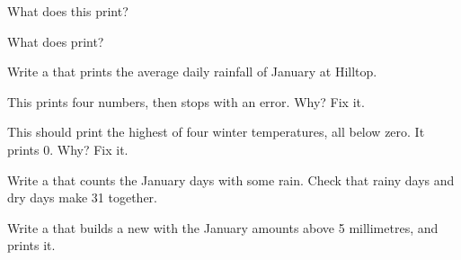 \begin{exercise}[$\star$]\label{exo:g7:lists:2}
What does this  print?

\label{lst:g7:lists:three-ops}
\end{exercise}

\begin{exercise}[$\star$]\label{exo:g7:lists:3}
What does  print?
\end{exercise}

\begin{exercise}[$\star$]\label{exo:g7:lists:4}
Write a  that prints the average daily rainfall of January at Hilltop.
\end{exercise}

\begin{exercise}[$\star\star$]\label{exo:g7:lists:5}
This  prints four numbers, then stops with an error. Why? Fix it.

\label{lst:g7:lists:off-by-one}
\end{exercise}

\begin{exercise}[$\star\star$]\label{exo:g7:lists:6}
This  should print the highest of four winter temperatures, all below
zero. It prints 0. Why? Fix it.

\label{lst:g7:lists:largest-bug}
\end{exercise}

\begin{exercise}[$\star\star$]\label{exo:g7:lists:7}
Write a  that counts the January days with some rain. Check that
rainy days and dry days make 31 together.
\end{exercise}

\begin{exercise}[$\star\star$]\label{exo:g7:lists:8}
Write a  that builds a new  with the January amounts above 5
millimetres, and prints it.
\end{exercise}

